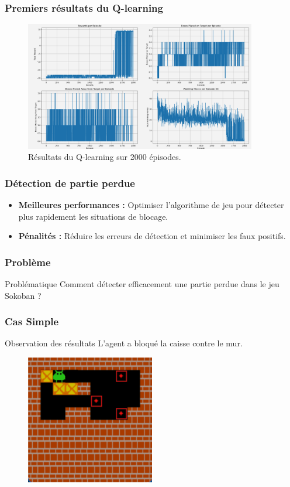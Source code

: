 \documentclass[
	11pt, %
]{beamer}
\begin{document}
\begin{frame}
    \frametitle{Premiers résultats du Q-learning}
    \begin{figure}
        \centering
        \includegraphics[width=0.9\textwidth]{Images/resultat_2000.png}
        \caption{Résultats du Q-learning sur 2000 épisodes.}
    \end{figure}
\end{frame}

\begin{frame}
    \frametitle{Détection de partie perdue}
    \begin{itemize}
        \item \textbf{Meilleures performances :} Optimiser l'algorithme de jeu pour détecter plus rapidement les situations de blocage.
        \item \textbf{Pénalités :} Réduire les erreurs de détection et minimiser les faux positifs.
    \end{itemize}

    \frametitle{Problème}
    \begin{block}{Problématique}
        Comment détecter efficacement une partie perdue dans le jeu Sokoban ?
    \end{block}
\end{frame}

\begin{frame}
    \frametitle{Cas Simple}
    \begin{block}{Observation des résultats}
        \small L'agent a bloqué la caisse contre le mur.
    \end{block}
    \begin{figure}
        \centering
        \includegraphics[width=0.5\textwidth]{Images/sokoban_cas_1.png}
    \end{figure}
\end{frame}
\end{document}
